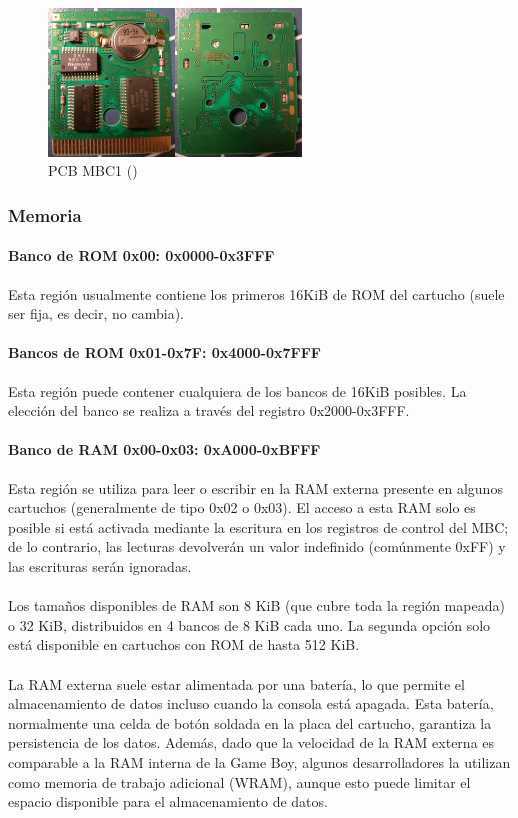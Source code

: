 \begin{figure}[H]
    \centering
    \includegraphics[width=0.6\textwidth]{include/images/mbc1.jpg}
    \caption{PCB MBC1 (\cite{hardwaredatabase})}
    \label{figure:cart_mbc1}
\end{figure}

\subsubsection{Memoria}

\paragraph{Banco de ROM 0x00: 0x0000-0x3FFF}
\label{par:rom0bank}
Esta región usualmente contiene los primeros 16KiB de ROM del cartucho (suele ser fija, es decir, no cambia).

\paragraph{Bancos de ROM 0x01-0x7F: 0x4000-0x7FFF}
Esta región puede contener cualquiera de los bancos de 16KiB posibles. La elección del banco se realiza a través del registro 0x2000-0x3FFF.

\paragraph{Banco de RAM 0x00-0x03: 0xA000-0xBFFF}
Esta región se utiliza para leer o escribir en la RAM externa presente en algunos cartuchos (generalmente de tipo 0x02 o 0x03). El acceso a esta RAM solo es posible si está activada mediante la escritura en los registros de control del MBC; de lo contrario, las lecturas devolverán un valor indefinido (comúnmente 0xFF) y las escrituras serán ignoradas.
\\\\
Los tamaños disponibles de RAM son 8 KiB (que cubre toda la región mapeada) o 32 KiB, distribuidos en 4 bancos de 8 KiB cada uno. La segunda opción solo está disponible en cartuchos con ROM de hasta 512 KiB.
\\\\
La RAM externa suele estar alimentada por una batería, lo que permite el almacenamiento de datos incluso cuando la consola está apagada. Esta batería, normalmente una celda de botón soldada en la placa del cartucho, garantiza la persistencia de los datos. Además, dado que la velocidad de la RAM externa es comparable a la RAM interna de la Game Boy, algunos desarrolladores la utilizan como memoria de trabajo adicional (WRAM), aunque esto puede limitar el espacio disponible para el almacenamiento de datos.

